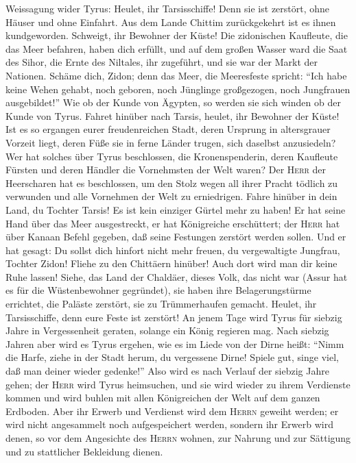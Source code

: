  Weissagung wider Tyrus: Heulet, ihr Tarsisschiffe! Denn
sie ist zerstört, ohne Häuser und ohne Einfahrt. Aus dem Lande Chittim
zurückgekehrt ist es ihnen kundgeworden.  Schweigt, ihr
Bewohner der Küste! Die zidonischen Kaufleute, die das Meer befahren,
haben dich erfüllt,  und auf dem großen Wasser ward die
Saat des Sihor, die Ernte des Niltales, ihr zugeführt, und sie war der
Markt der Nationen.  Schäme dich, Zidon; denn das Meer,
die Meeresfeste spricht: ``Ich habe keine Wehen gehabt, noch geboren,
noch Jünglinge großgezogen, noch Jungfrauen ausgebildet!''
 Wie ob der Kunde von Ägypten, so werden sie sich winden
ob der Kunde von Tyrus.  Fahret hinüber nach Tarsis,
heulet, ihr Bewohner der Küste!  Ist es so ergangen eurer
freudenreichen Stadt, deren Ursprung in altersgrauer Vorzeit liegt,
deren Füße sie in ferne Länder trugen, sich daselbst anzusiedeln?
 Wer hat solches über Tyrus beschlossen, die
Kronenspenderin, deren Kaufleute Fürsten und deren Händler die
Vornehmsten der Welt waren?  Der \textsc{Herr} der
Heerscharen hat es beschlossen, um den Stolz wegen all ihrer Pracht
tödlich zu verwunden und alle Vornehmen der Welt zu erniedrigen.
 Fahre hinüber in dein Land, du Tochter Tarsis! Es ist
kein einziger Gürtel mehr zu haben!  Er hat seine Hand
über das Meer ausgestreckt, er hat Königreiche erschüttert; der
\textsc{Herr} hat über Kanaan Befehl gegeben, daß seine Festungen
zerstört werden sollen.  Und er hat gesagt: Du sollst
dich hinfort nicht mehr freuen, du vergewaltigte Jungfrau, Tochter
Zidon! Fliehe zu den Chittäern hinüber! Auch dort wird man dir keine
Ruhe lassen!  Siehe, das Land der Chaldäer, dieses Volk,
das nicht war (Assur hat es für die Wüstenbewohner gegründet), sie haben
ihre Belagerungstürme errichtet, die Paläste zerstört, sie zu
Trümmerhaufen gemacht.  Heulet, ihr Tarsisschiffe, denn
eure Feste ist zerstört!  An jenem Tage wird Tyrus für
siebzig Jahre in Vergessenheit geraten, solange ein König regieren mag.
Nach siebzig Jahren aber wird es Tyrus ergehen, wie es im Liede von der
Dirne heißt:  ``Nimm die Harfe, ziehe in der Stadt herum,
du vergessene Dirne! Spiele gut, singe viel, daß man deiner wieder
gedenke!''  Also wird es nach Verlauf der siebzig Jahre
gehen; der \textsc{Herr} wird Tyrus heimsuchen, und sie wird wieder zu
ihrem Verdienste kommen und wird buhlen mit allen Königreichen der Welt
auf dem ganzen Erdboden.  Aber ihr Erwerb und Verdienst
wird dem \textsc{Herrn} geweiht werden; er wird nicht angesammelt noch
aufgespeichert werden, sondern ihr Erwerb wird denen, so vor dem
Angesichte des \textsc{Herrn} wohnen, zur Nahrung und zur Sättigung und
zu stattlicher Bekleidung dienen.

